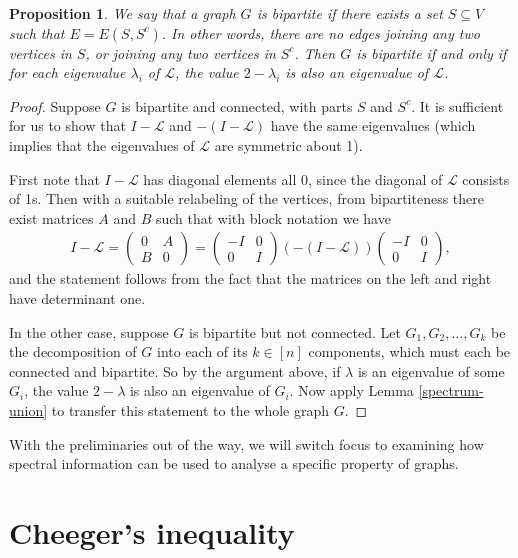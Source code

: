 \documentclass[a4paper,11pt]{article}
\newtheorem{proposition}[theorem]{Proposition}
\theoremstyle{definition}
\renewcommand{\L}{\mathcal{L}}
\begin{document}
\begin{proposition}
We say that a graph $G$ is \emph{bipartite} if there exists a set $S \subseteq V$ such that $E = E(S, S^c)$. In other words, there are no edges joining any two vertices in $S$, or joining any two vertices in $S^c$. Then $G$ is bipartite if and only if for each eigenvalue $\lambda_i$ of $\L$, the value $2 - \lambda_i$ is also an eigenvalue of $\L$.
\end{proposition}
\begin{proof}
Suppose $G$ is bipartite and connected, with parts $S$ and $S^c$. It is sufficient for us to show that $I - \L$ and $-(I - \L)$ have the same eigenvalues (which implies that the eigenvalues of $\L$ are symmetric about 1).

First note that $I - \L$ has diagonal elements all 0, since the diagonal of $\L$ consists of 1s. Then with a suitable relabeling of the vertices, from bipartiteness there exist matrices $A$ and $B$ such that with block notation we have
\begin{align*}
I - \L = \begin{pmatrix}0 & A\\B & 0\end{pmatrix} =
\begin{pmatrix} -I & 0 \\ 0 & I \end{pmatrix}
(-(I - \L))
\begin{pmatrix} -I & 0 \\ 0 & I \end{pmatrix},
\end{align*}
and the statement follows from the fact that the matrices on the left and right have determinant one.

In the other case, suppose $G$ is bipartite but not connected. Let $G_1, G_2, \dots, G_k$ be the decomposition of $G$ into each of its $k \in [n]$ components, which must each be connected and bipartite. So by the argument above, if $\lambda$ is an eigenvalue of some $G_i$, the value $2 - \lambda$ is also an eigenvalue of $G_i$. Now apply Lemma \ref{spectrum-union} to transfer this statement to the whole graph $G$.
\end{proof}

With the preliminaries out of the way, we will switch focus to examining how spectral information can be used to analyse a specific property of graphs.

\section{Cheeger's inequality}\label{fo-cheeger-section}
\end{document}
